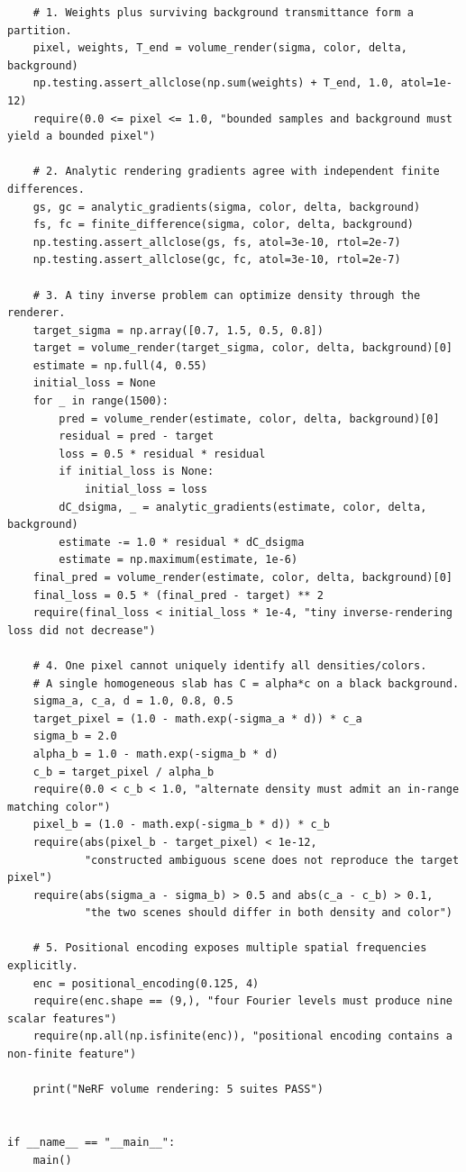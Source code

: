 \begin{verbatim}
    # 1. Weights plus surviving background transmittance form a partition.
    pixel, weights, T_end = volume_render(sigma, color, delta, background)
    np.testing.assert_allclose(np.sum(weights) + T_end, 1.0, atol=1e-12)
    require(0.0 <= pixel <= 1.0, "bounded samples and background must yield a bounded pixel")

    # 2. Analytic rendering gradients agree with independent finite differences.
    gs, gc = analytic_gradients(sigma, color, delta, background)
    fs, fc = finite_difference(sigma, color, delta, background)
    np.testing.assert_allclose(gs, fs, atol=3e-10, rtol=2e-7)
    np.testing.assert_allclose(gc, fc, atol=3e-10, rtol=2e-7)

    # 3. A tiny inverse problem can optimize density through the renderer.
    target_sigma = np.array([0.7, 1.5, 0.5, 0.8])
    target = volume_render(target_sigma, color, delta, background)[0]
    estimate = np.full(4, 0.55)
    initial_loss = None
    for _ in range(1500):
        pred = volume_render(estimate, color, delta, background)[0]
        residual = pred - target
        loss = 0.5 * residual * residual
        if initial_loss is None:
            initial_loss = loss
        dC_dsigma, _ = analytic_gradients(estimate, color, delta, background)
        estimate -= 1.0 * residual * dC_dsigma
        estimate = np.maximum(estimate, 1e-6)
    final_pred = volume_render(estimate, color, delta, background)[0]
    final_loss = 0.5 * (final_pred - target) ** 2
    require(final_loss < initial_loss * 1e-4, "tiny inverse-rendering loss did not decrease")

    # 4. One pixel cannot uniquely identify all densities/colors.
    # A single homogeneous slab has C = alpha*c on a black background.
    sigma_a, c_a, d = 1.0, 0.8, 0.5
    target_pixel = (1.0 - math.exp(-sigma_a * d)) * c_a
    sigma_b = 2.0
    alpha_b = 1.0 - math.exp(-sigma_b * d)
    c_b = target_pixel / alpha_b
    require(0.0 < c_b < 1.0, "alternate density must admit an in-range matching color")
    pixel_b = (1.0 - math.exp(-sigma_b * d)) * c_b
    require(abs(pixel_b - target_pixel) < 1e-12,
            "constructed ambiguous scene does not reproduce the target pixel")
    require(abs(sigma_a - sigma_b) > 0.5 and abs(c_a - c_b) > 0.1,
            "the two scenes should differ in both density and color")

    # 5. Positional encoding exposes multiple spatial frequencies explicitly.
    enc = positional_encoding(0.125, 4)
    require(enc.shape == (9,), "four Fourier levels must produce nine scalar features")
    require(np.all(np.isfinite(enc)), "positional encoding contains a non-finite feature")

    print("NeRF volume rendering: 5 suites PASS")


if __name__ == "__main__":
    main()
\end{verbatim}

